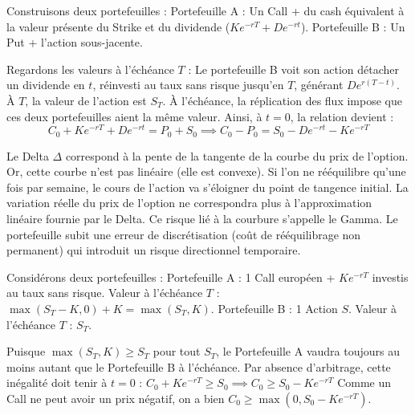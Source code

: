 \begin{correctionbox}
Construisons deux portefeuilles :
Portefeuille A : Un Call + du cash équivalent à la valeur présente du Strike et du dividende ($K e^{-rT} + D e^{-rt}$).
Portefeuille B : Un Put + l'action sous-jacente.

Regardons les valeurs à l'échéance $T$ :
Le portefeuille B voit son action détacher un dividende en $t$, réinvesti au taux sans risque jusqu'en $T$, générant $D e^{r(T-t)}$. À $T$, la valeur de l'action est $S_T$.
À l'échéance, la réplication des flux impose que ces deux portefeuilles aient la même valeur. Ainsi, à $t=0$, la relation devient :
\begin{equation*}
    C_0 + K e^{-rT} + D e^{-rt} = P_0 + S_0 \implies C_0 - P_0 = S_0 - D e^{-rt} - K e^{-rT}
\end{equation*}
\end{correctionbox}

\newpage

\begin{correctionbox}
Le Delta $\Delta$ correspond à la pente de la tangente de la courbe du prix de l'option. Or, cette courbe n'est pas linéaire (elle est convexe). Si l'on ne rééquilibre qu'une fois par semaine, le cours de l'action va s'éloigner du point de tangence initial. La variation réelle du prix de l'option ne correspondra plus à l'approximation linéaire fournie par le Delta.
Ce risque lié à la courbure s'appelle le Gamma. Le portefeuille subit une erreur de discrétisation (coût de rééquilibrage non permanent) qui introduit un risque directionnel temporaire.
\end{correctionbox}

\begin{correctionbox}
Considérons deux portefeuilles :
Portefeuille A : 1 Call européen + $K e^{-rT}$ investis au taux sans risque.
Valeur à l'échéance $T$ : $\max(S_T - K, 0) + K = \max(S_T, K)$.
Portefeuille B : 1 Action $S$.
Valeur à l'échéance $T$ : $S_T$.

Puisque $\max(S_T, K) \geq S_T$ pour tout $S_T$, le Portefeuille A vaudra toujours au moins autant que le Portefeuille B à l'échéance. Par absence d'arbitrage, cette inégalité doit tenir à $t=0$ :
$C_0 + K e^{-rT} \geq S_0 \implies C_0 \geq S_0 - K e^{-rT}$
Comme un Call ne peut avoir un prix négatif, on a bien $C_0 \geq \max(0, S_0 - K e^{-rT})$.
\end{correctionbox}

